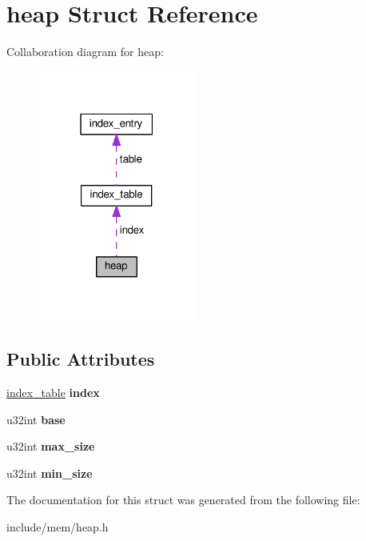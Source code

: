 \hypertarget{structheap}{}\section{heap Struct Reference}
\label{structheap}


Collaboration diagram for heap\+:
\nopagebreak
\begin{figure}[H]
\begin{center}
\leavevmode
\includegraphics[width=147pt]{structheap__coll__graph}
\end{center}
\end{figure}
\subsection*{Public Attributes}
\begin{DoxyCompactItemize}
\item 
\hyperlink{structindex__table}{index\+\_\+table} {\bfseries index}\hypertarget{structheap_a8fe6ce2a8b45088990071e9b1d35add2}{}\label{structheap_a8fe6ce2a8b45088990071e9b1d35add2}

\item 
u32int {\bfseries base}\hypertarget{structheap_a744634662f1ffdb4d85632e68c063e51}{}\label{structheap_a744634662f1ffdb4d85632e68c063e51}

\item 
u32int {\bfseries max\+\_\+size}\hypertarget{structheap_ad2e0262828735d6e437facbfce37d6b0}{}\label{structheap_ad2e0262828735d6e437facbfce37d6b0}

\item 
u32int {\bfseries min\+\_\+size}\hypertarget{structheap_a7b4422774c5ca7ac8ed5ddfe95f5c8ec}{}\label{structheap_a7b4422774c5ca7ac8ed5ddfe95f5c8ec}

\end{DoxyCompactItemize}


The documentation for this struct was generated from the following file\+:\begin{DoxyCompactItemize}
\item 
include/mem/heap.\+h\end{DoxyCompactItemize}
